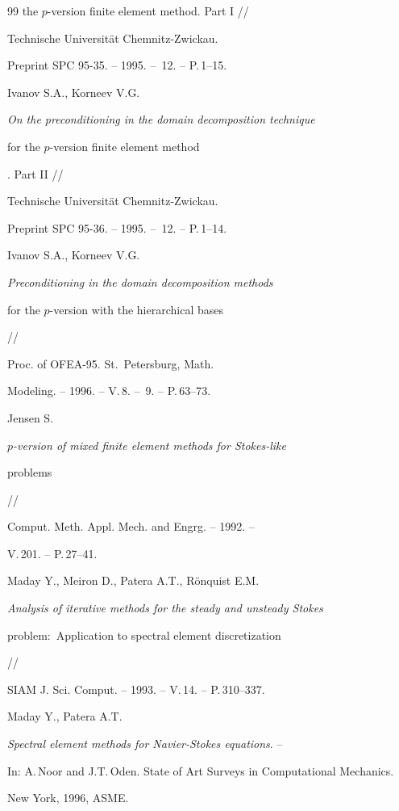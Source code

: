\begin{thebibliography}{99}
{the $p$-version finite element method}. Part I //


Technische Universit\"{a}t Chemnitz-Zwickau.


Preprint SPC 95-35. -- 1995. -- \No\,12. -- P.\,1--15.




Ivanov S.A., Korneev V.G.


{\it On the preconditioning in the domain decomposition technique


for the $p$-version finite element method}. Part II //


Technische Universit\"{a}t Chemnitz-Zwickau.


Preprint SPC 95-36. -- 1995. -- \No\,12. -- P.\,1--14.




Ivanov S.A., Korneev V.G.


{\it Preconditioning in the domain decomposition methods


for the $p$-version with the hierarchical bases} //


Proc. of OFEA-95. St.~Petersburg, Math.


Modeling. -- 1996. -- V.\,8. -- \No\,9. -- P.\,63--73.




Jensen S.


{\it $p$-version of mixed finite element methods for Stokes-like


problems} //


Comput. Meth. Appl. Mech. and Engrg. -- 1992. --


V.\,201. -- P.\,27--41.




Maday Y., Meiron D., Patera A.T., R\"{o}nquist E.M.


{\it Analysis of iterative methods for the steady and unsteady Stokes


problem$:$ Application to spectral element discretization} //


SIAM J. Sci. Comput. -- 1993. -- V.\,14. -- P.\,310--337.




Maday Y., Patera A.T.


{\it Spectral element methods for Navier-Stokes equations}. --


In: A.\,Noor and J.T.\,Oden. State of Art Surveys in Computational Mechanics.


New York, 1996, ASME.



\end{thebibliography}
